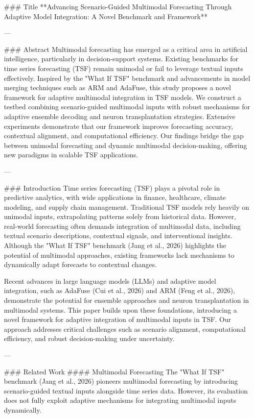 ### Title  
**Advancing Scenario-Guided Multimodal Forecasting Through Adaptive Model Integration: A Novel Benchmark and Framework**

---

### Abstract  
Multimodal forecasting has emerged as a critical area in artificial intelligence, particularly in decision-support systems. Existing benchmarks for time series forecasting (TSF) remain unimodal or fail to leverage textual inputs effectively. Inspired by the "What If TSF" benchmark and advancements in model merging techniques such as ARM and AdaFuse, this study proposes a novel framework for adaptive multimodal integration in TSF models. We construct a testbed combining scenario-guided multimodal inputs with robust mechanisms for adaptive ensemble decoding and neuron transplantation strategies. Extensive experiments demonstrate that our framework improves forecasting accuracy, contextual alignment, and computational efficiency. Our findings bridge the gap between unimodal forecasting and dynamic multimodal decision-making, offering new paradigms in scalable TSF applications.

---

### Introduction  
Time series forecasting (TSF) plays a pivotal role in predictive analytics, with wide applications in finance, healthcare, climate modeling, and supply chain management. Traditional TSF models rely heavily on unimodal inputs, extrapolating patterns solely from historical data. However, real-world forecasting often demands integration of multimodal data, including textual scenario descriptions, contextual signals, and interventional insights. Although the "What If TSF" benchmark (Jang et al., 2026) highlights the potential of multimodal approaches, existing frameworks lack mechanisms to dynamically adapt forecasts to contextual changes.  

Recent advances in large language models (LLMs) and adaptive model integration, such as AdaFuse (Cui et al., 2026) and ARM (Feng et al., 2026), demonstrate the potential for ensemble approaches and neuron transplantation in multimodal systems. This paper builds upon these foundations, introducing a novel framework for adaptive integration of multimodal inputs in TSF. Our approach addresses critical challenges such as scenario alignment, computational efficiency, and robust decision-making under uncertainty.

---

### Related Work  
#### Multimodal Forecasting  
The "What If TSF" benchmark (Jang et al., 2026) pioneers multimodal forecasting by introducing scenario-guided textual inputs alongside time series data. However, its evaluation does not fully exploit adaptive mechanisms for integrating multimodal inputs dynamically.  

